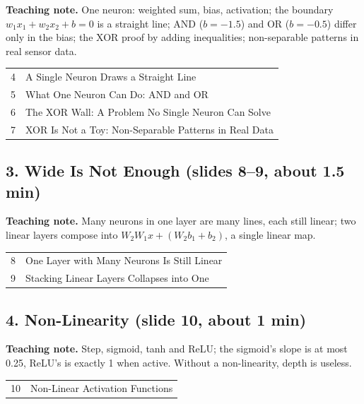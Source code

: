 \documentclass[11pt]{article}
\begin{document}
\textbf{Teaching note.} One neuron: weighted sum, bias, activation; the boundary $w_1x_1+w_2x_2+b=0$ is a straight line; AND ($b=-1.5$) and OR ($b=-0.5$) differ only in the bias; the XOR proof by adding inequalities; non-separable patterns in real sensor data.

\begin{center}\small\renewcommand{\arraystretch}{1.1}\begin{tabularx}{\textwidth}{@{}r X@{}}4 & A Single Neuron Draws a Straight Line\\
5 & What One Neuron Can Do: AND and OR\\
6 & The XOR Wall: A Problem No Single Neuron Can Solve\\
7 & XOR Is Not a Toy: Non-Separable Patterns in Real Data\\\end{tabularx}\end{center}

\subsection{3. Wide Is Not Enough \normalfont\small\color{GreyN}(slides 8--9, about 1.5 min)}

\textbf{Teaching note.} Many neurons in one layer are many lines, each still linear; two linear layers compose into $W_2W_1x+(W_2b_1+b_2)$, a single linear map.

\begin{center}\small\renewcommand{\arraystretch}{1.1}\begin{tabularx}{\textwidth}{@{}r X@{}}8 & One Layer with Many Neurons Is Still Linear\\
9 & Stacking Linear Layers Collapses into One\\\end{tabularx}\end{center}

\subsection{4. Non-Linearity \normalfont\small\color{GreyN}(slide 10, about 1 min)}

\textbf{Teaching note.} Step, sigmoid, tanh and ReLU; the sigmoid's slope is at most 0.25, ReLU's is exactly 1 when active. Without a non-linearity, depth is useless.

\begin{center}\small\renewcommand{\arraystretch}{1.1}\begin{tabularx}{\textwidth}{@{}r X@{}}10 & Non-Linear Activation Functions\\\end{tabularx}\end{center}
\end{document}
